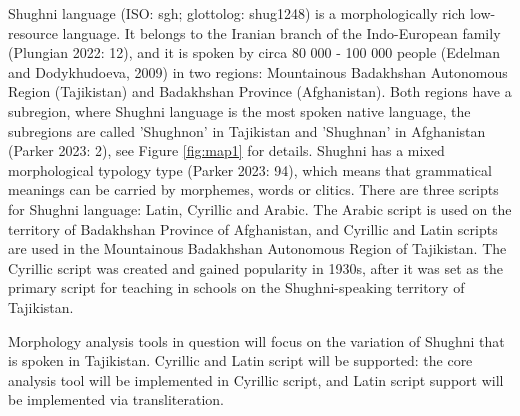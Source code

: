 \par Shughni language (ISO: sgh; glottolog: shug1248) is a morphologically rich low-resource language. It belongs to the Iranian branch of the Indo-European family (Plungian 2022: 12), and it is spoken by circa 80 000 - 100 000 people (Edelman and Dodykhudoeva, 2009) in two regions: Mountainous Badakhshan Autonomous Region (Tajikistan) and Badakhshan Province (Afghanistan). Both regions have a subregion, where Shughni language is the most spoken native language, the subregions are called 'Shughnon' in Tajikistan and 'Shughnan' in Afghanistan (Parker 2023: 2), see Figure \ref{fig:map1} for details. Shughni has a mixed morphological typology type (Parker 2023: 94), which means that grammatical meanings can be carried by morphemes, words or clitics. There are three scripts for Shughni language: Latin, Cyrillic and Arabic. The Arabic script is used on the territory of Badakhshan Province of Afghanistan, and Cyrillic and Latin scripts are used in the Mountainous Badakhshan Autonomous Region of Tajikistan. The Cyrillic script was created and gained popularity in 1930s, after it was set as the primary script for teaching in schools on the Shughni-speaking territory of Tajikistan.
\par Morphology analysis tools in question will focus on the variation of Shughni that is spoken in Tajikistan. Cyrillic and Latin script will be supported: the core analysis tool will be implemented in Cyrillic script, and Latin script support will be implemented via transliteration.
